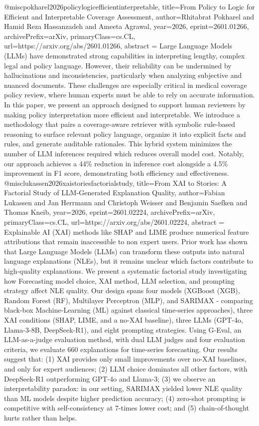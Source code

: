 {}@misc{pokharel2026policylogicefficientinterpretable,
      title={From Policy to Logic for Efficient and Interpretable Coverage Assessment}, 
      author={Rhitabrat Pokharel and Hamid Reza Hassanzadeh and Ameeta Agrawal},
      year={2026},
      eprint={2601.01266},
      archivePrefix={arXiv},
      primaryClass={cs.CL},
      url={https://arxiv.org/abs/2601.01266},
      abstract = {Large Language Models (LLMs) have demonstrated strong capabilities in interpreting lengthy, complex legal and policy language. However, their reliability can be undermined by hallucinations and inconsistencies, particularly when analyzing subjective and nuanced documents. These challenges are especially critical in medical coverage policy review, where human experts must be able to rely on accurate information. In this paper, we present an approach designed to support human reviewers by making policy interpretation more efficient and interpretable. We introduce a methodology that pairs a coverage-aware retriever with symbolic rule-based reasoning to surface relevant policy language, organize it into explicit facts and rules, and generate auditable rationales. This hybrid system minimizes the number of LLM inferences required which reduces overall model cost. Notably, our approach achieves a 44\% reduction in inference cost alongside a 4.5\% improvement in F1 score, demonstrating both efficiency and effectiveness.}
}@misc{lukassen2026xaistoriesfactorialstudy,
      title={From XAI to Stories: A Factorial Study of LLM-Generated Explanation Quality}, 
      author={Fabian Lukassen and Jan Herrmann and Christoph Weisser and Benjamin Saefken and Thomas Kneib},
      year={2026},
      eprint={2601.02224},
      archivePrefix={arXiv},
      primaryClass={cs.CL},
      url={https://arxiv.org/abs/2601.02224},
      abstract = {Explainable AI (XAI) methods like SHAP and LIME produce numerical feature attributions that remain inaccessible to non expert users. Prior work has shown that Large Language Models (LLMs) can transform these outputs into natural language explanations (NLEs), but it remains unclear which factors contribute to high-quality explanations. We present a systematic factorial study investigating how Forecasting model choice, XAI method, LLM selection, and prompting strategy affect NLE quality. Our design spans four models (XGBoost (XGB), Random Forest (RF), Multilayer Perceptron (MLP), and SARIMAX - comparing black-box Machine-Learning (ML) against classical time-series approaches), three XAI conditions (SHAP, LIME, and a no-XAI baseline), three LLMs (GPT-4o, Llama-3-8B, DeepSeek-R1), and eight prompting strategies. Using G-Eval, an LLM-as-a-judge evaluation method, with dual LLM judges and four evaluation criteria, we evaluate 660 explanations for time-series forecasting. Our results suggest that: (1) XAI provides only small improvements over no-XAI baselines, and only for expert audiences; (2) LLM choice dominates all other factors, with DeepSeek-R1 outperforming GPT-4o and Llama-3; (3) we observe an interpretability paradox: in our setting, SARIMAX yielded lower NLE quality than ML models despite higher prediction accuracy; (4) zero-shot prompting is competitive with self-consistency at 7-times lower cost; and (5) chain-of-thought hurts rather than helps.}
}
